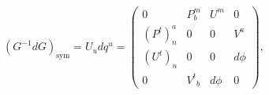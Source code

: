 \begin{equation}
(G^{-1}dG)_{\mathrm{sym}} =U_udq^u=\begin{pmatrix} 0&P^m_b&U^m&0\\
(P^t)^a_n&0&0&V^a\\
({U^t})_n&0&0&d\phi\\
0&{V^t}_b&d\phi&0\end{pmatrix},\label{explvielbein}
\end{equation}

